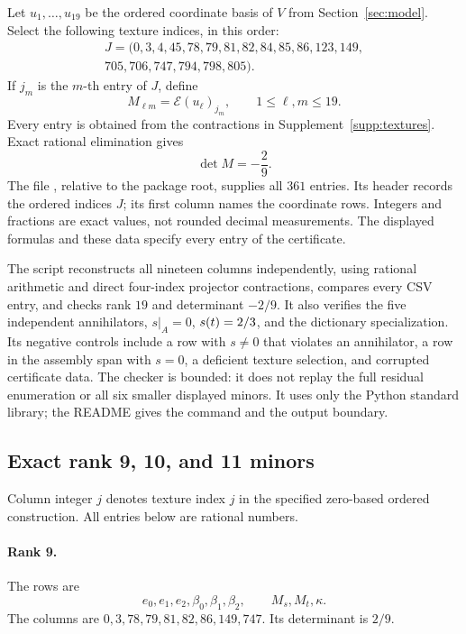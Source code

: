 Let $u_1,\ldots,u_{19}$ be the ordered coordinate basis of $V$ from
Section~\ref{sec:model}.  Select the following texture indices, in this order:
\[
\begin{gathered}
J=(0,3,4,45,78,79,81,82,84,85,86,123,149,\\
705,706,747,794,798,805).
\end{gathered}
\]
If $j_m$ is the $m$-th entry of $J$, define
\[
M_{\ell m}=\mathcal E(u_\ell)_{j_m},\qquad 1\leq\ell,m\leq19.
\]
Every entry is obtained from the contractions in
Supplement~\ref{supp:textures}.  Exact rational elimination gives
\[
\det M=-\frac29.
\]
The file , relative to the package
root, supplies all $361$ entries.  Its header records the ordered indices
$J$; its first column names the coordinate rows.  Integers and fractions
are exact values, not rounded decimal measurements.  The displayed formulas
and these data specify every entry of the certificate.

The script  reconstructs all nineteen columns
independently, using rational arithmetic and direct four-index projector
contractions, compares every CSV entry, and checks rank $19$ and determinant
$-2/9$.  It also verifies the five independent annihilators, $s|_A=0$,
$s(t)=2/3$, and the dictionary specialization.  Its negative controls
include a row with $s\ne0$ that violates an annihilator, a row in the assembly span with
$s=0$, a deficient texture selection, and corrupted certificate data.
The checker is bounded: it does not replay the full residual enumeration or
all six smaller displayed minors.  It uses only the Python standard library;
the README gives the command and the output boundary.

\subsection{Exact rank 9, 10, and 11 minors}\label{supp:minors}

Column integer $j$ denotes texture index $j$ in the specified zero-based
ordered construction.  All entries below are rational numbers.

\paragraph{Rank 9.}
The rows are
\[
e_0,e_1,e_2,\beta_0,\beta_1,\beta_2,\qquad M_s,M_t,\kappa.
\]
The columns are $0,3,78,79,81,82,86,149,747$.
Its determinant is $2/9$.

